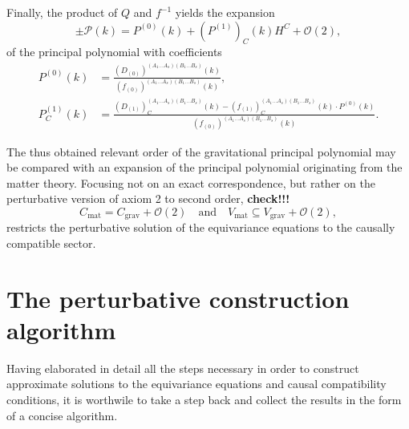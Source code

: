 Finally, the product of $Q$ and $f^{-1}$ yields the expansion
\begin{equation}
  \pm \mathcal P(k) = P^{(0)}(k) + (P^{(1)})_C(k) H^C + \mathcal O(2),
\end{equation}
of the principal polynomial with coefficients
\begin{equation}\label{expansion_coefficients_poly}
  \begin{aligned}
    P^{(0)}(k) &{} = \frac{(D_{(0)})^{(A_1\dots A_s)(B_1\dots B_s)}(k)}{(f_{(0)})^{(A_1\dots A_s)(B_1\dots B_s)}(k)}, \\
    P^{(1)}_C(k) &{} = \frac{(D_{(1)})^{(A_1\dots A_s)(B_1\dots B_s)}_C(k) - (f_{(1)})^{(A_1\dots A_s)(B_1\dots B_s)}_C(k) \cdot P^{(0)}(k)}{(f_{(0)})^{(A_1\dots A_s)(B_1\dots B_s)}(k)}.
  \end{aligned}
\end{equation}

The thus obtained relevant order of the gravitational principal polynomial may be compared with an expansion of the principal polynomial originating from the matter theory. Focusing not on an exact correspondence, but rather on the perturbative version of axiom 2 to second order, \textbf{check!!!}
\begin{equation}
  C_\text{mat} = C_\text{grav} + \mathcal O(2) \quad\text{and}\quad V_\text{mat} \subseteq V_\text{grav} + \mathcal O(2),
\end{equation}
restricts the perturbative solution of the equivariance equations to the causally compatible sector.

\section{The perturbative construction algorithm}

Having elaborated in detail all the steps necessary in order to construct approximate solutions to the equivariance equations and causal compatibility conditions, it is worthwile to take a step back and collect the results in the form of a concise algorithm.

